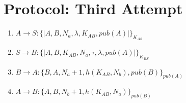 
\section{Protocol: Third Attempt}

\begin{enumerate}
    \item $ A \rightarrow S : \{|A, B, N_a, \lambda, K_{AB}, pub(A)|\}_{K_{AS}}$
    \item $ S \rightarrow B : \{|A,B,K_{AB},N_a, \tau, \lambda, pub(A) |\}_{K_{BS}}$
    \item $ B \rightarrow A : \{B, A, N_a+1, h(K_{AB}, N_b), pub(B)\}_{pub(A)}$
    \item $ A \rightarrow B : \{A, B, N_b+1, h(K_{AB}, N_a)\}_{pub(B)}$

\end{enumerate}